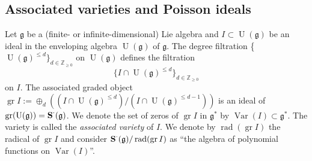 \documentclass{emsprocart}
\newtheorem{theorem}{Theorem}[section]
\newtheorem{corollary}[theorem]{Corollary}
\begin{document}




\subsection{Associated varieties and Poisson ideals}\label{SSavpi}
Let $\mathfrak g$ be a (finite- or infinite-dimensional) Lie algebra and $I\subset\operatorname{U}(\mathfrak g)$ be an ideal in the enveloping algebra
$\operatorname{U}(\mathfrak g)$ of $\mathfrak g$. The degree filtration \{$\operatorname{U}(\mathfrak g)^{\le
d}\}_{d\in\mathbb Z_{\ge0}}$ on $\operatorname{U}(\mathfrak g)$ defines the filtration $$\{I\cap \operatorname{U}(\mathfrak g)^{\le
d}\}_{d\in\mathbb Z_{\ge0}}$$ on $I$. The associated graded object
$\operatorname{gr} I:=\oplus_d((I\cap\operatorname{U}(\mathfrak g)^{\le d})/(I\cap\operatorname{U}(\mathfrak g)^{\le
d-1}))$ is an ideal of $\operatorname{gr}(\operatorname{U}(\mathfrak g))=\operatorname{\bf S}^\cdot(\mathfrak g)$. We denote the set of zeros of $\operatorname{gr} I$ in $\mathfrak g^*$ by $\operatorname{Var}(I)\subset\mathfrak g^*$. The variety is called the {\it associated variety} of $I$. We denote by $\operatorname{rad}(\operatorname{gr} I)$ the radical of $\operatorname{gr} I$ and consider $\operatorname{\bf S}^\cdot(\mathfrak g)/\operatorname{rad}(\operatorname{gr} I)$ as ``the algebra of polynomial functions on $\operatorname{Var}(I)$''.
\end{document}
